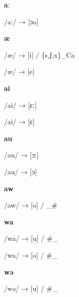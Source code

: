 \begin{center}\textbf{aː}\end{center}
\begin{multicols}{4}
\noindent /aː/ → [ɔa]
\end{multicols}


\begin{center}\textbf{æ}\end{center}
\begin{multicols}{4}
\noindent /æ/ → [i] / \{s,ʃ,x\}\_Ca

\noindent /æ/ → [e]
\end{multicols}


\begin{center}\textbf{ai}\end{center}
\begin{multicols}{4}
\noindent /ai/ → [ɛː]

\noindent /ai/ → [ɛ]
\end{multicols}


\begin{center}\textbf{au}\end{center}
\begin{multicols}{4}
\noindent /au/ → [ɔː]

\noindent /au/ → [ɔ]
\end{multicols}


\begin{center}\textbf{aw}\end{center}
\begin{multicols}{4}
\noindent /aw/ → [o] / \_\#
\end{multicols}


\begin{center}\textbf{wa}\end{center}
\begin{multicols}{4}
\noindent /wa/ → [u] / \#\_

\noindent /wa/ → [o] / \#\_
\end{multicols}


\begin{center}\textbf{wə}\end{center}
\begin{multicols}{4}
\noindent /wə/ → [u] / \#\_
\end{multicols}



